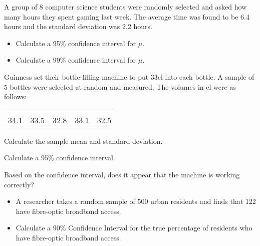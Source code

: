 \item
A group of 8 computer science students were randomly selected and asked how many hours they spent gaming last week. The average time was found to be 6.4 hours and the standard deviation was 2.2 hours.
\begin{itemize}
\item Calculate a 95\% confidence interval for $\mu$. 
\item Calculate a 99\% confidence interval for $\mu$.
\end{itemize}

\item 
Guinness set their bottle-filling machine to put 33cl into each bottle. A sample of 5 bottles were selected at random and measured. The volumes in cl were as follows:\\
\begin{center}
\begin{tabular}{|ccccc|}
\hline
&&&&\\[-0.3cm]
34.1  & 33.5 & 32.8 & 33.1 & 32.5\\[0.1cm]
\hline
\end{tabular}
\end{center}


\item  Calculate the sample mean and standard deviation. 
\item  Calculate a 95\% confidence interval.  
\item  Based on the confidence interval, does it appear that the machine is working correctly?





\begin{itemize}
\item A researcher takes a random sample of 500 urban residents and finds that
122 have fibre-optic broadband access. 
\item Calculate a 90\% Confidence Interval for
the true percentage of residents who have fibre-optic broadband access.
\end{itemize}


